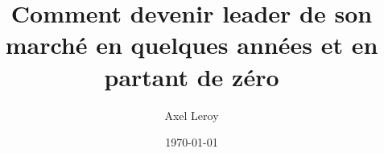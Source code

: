 \documentclass[11pt, a4paper, french, openright]{report}
\title{Comment devenir leader de son marché en quelques années et en partant de zéro}
\author{Axel Leroy}
\date{\today}
\begin{document}


\newpage
~
\thispagestyle{empty}
\newpage

\thispagestyle{empty}


\newpage
\thispagestyle{empty}
\newpage

\thispagestyle{empty}


\tableofcontents
\thispagestyle{empty}
\setcounter{page}{0}

\newpage
~
\thispagestyle{empty}
\setcounter{page}{0}
\newpage











\newpage
\nocite{SpaceXFirstISS, IFPI2011Report, SpotifyBloomberg, SpotifyNewYorker}
\printbibliography
\end{document}
